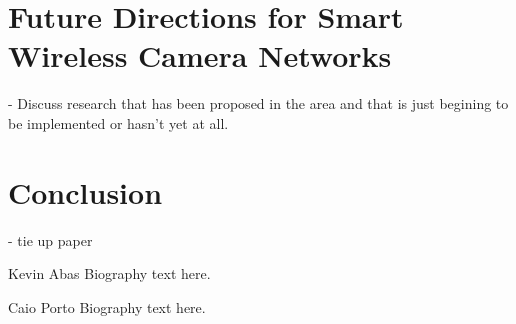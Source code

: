\documentclass[journal,transmag]{IEEEtran}
\begin{document}
\section{Future Directions for Smart Wireless Camera Networks}
\-- Discuss research that has been proposed in the area and that is just begining to be implemented or hasn't yet at all.\\

\section{Conclusion}
\-- tie up paper
~\cite{DSPcam}
~\cite{HuSIMS}
~\cite{Citric}
~\cite{OmniEye}
~\cite{ScoutNode}
~\cite{SensEye}
~\cite{WiFLIP}






{}




\begin{IEEEbiographynophoto}{Kevin Abas}
Biography text here.
\end{IEEEbiographynophoto}

\begin{IEEEbiographynophoto}{Caio Porto}
Biography text here.
\end{IEEEbiographynophoto}
\end{document}

